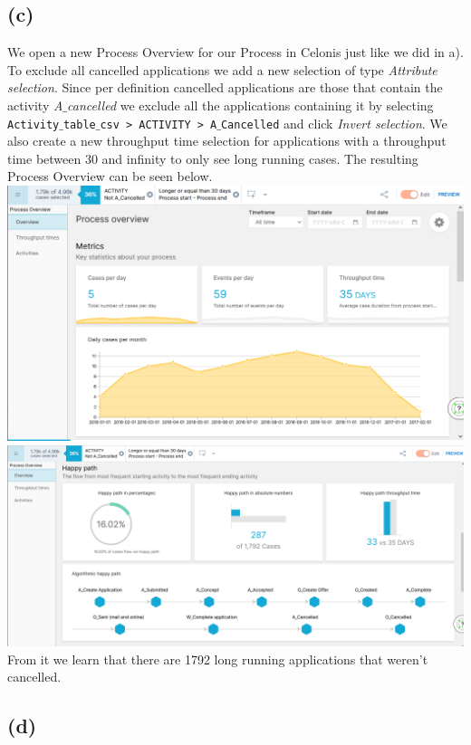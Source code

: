 \documentclass[../../main.tex]{subfiles}
\begin{document}
\subsection*{(c)}
We open a new Process Overview for our Process in Celonis just like we did in a). To exclude all cancelled applications we add a new selection of type \textit{Attribute selection}. Since per definition cancelled applications are those that contain the activity \textit{A$\_$cancelled} we exclude all the applications containing it by selecting \texttt{Activity$\_$table$\_$csv > ACTIVITY > A$\_$Cancelled} and click \textit{Invert selection}. We also create a new throughput time selection for applications with a throughput time between 30 and infinity to only see long running cases. The resulting Process Overview can be seen below.\\
\includegraphics[width=\textwidth]{img/QUESTION_5c_process_overview.png}
\includegraphics[width=\textwidth]{img/QUESTION_5c_process_overview_happy_path.png}
From it we learn that there are 1792 long running applications that weren't cancelled. 


\subsection*{(d)}
\end{document}
